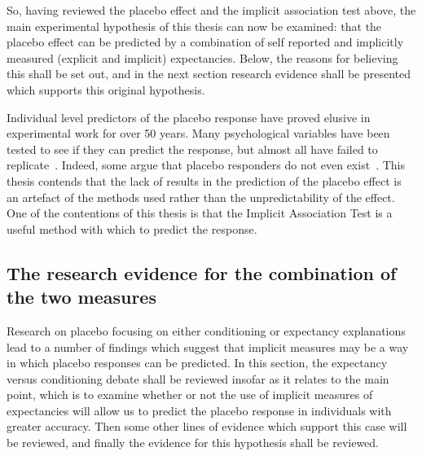 
So, having reviewed the placebo effect and the implicit association test above, the main experimental hypothesis of this thesis can now be examined: that the placebo effect can be predicted by a combination of self reported and implicitly measured (explicit and implicit) expectancies. Below, the reasons for believing this shall be set out, and in the next section  research evidence shall be presented which supports this original hypothesis. 

Individual level predictors of the placebo response have proved elusive in experimental work for over 50 years. Many psychological variables have been tested to see if they can predict the response, but almost all have failed to replicate~\cite{Shapiro1997}. Indeed, some argue that placebo responders do not even exist~\cite{Kaptchuk2008a}. This thesis contends that the lack of results in the prediction of the placebo effect is an artefact of the methods used rather than the unpredictability of the effect. One of the contentions of this thesis is that the Implicit Association Test is a useful method with which to predict the response. 


\subsection{The research evidence for the combination of the two measures}
\label{sec:rese-base-comb}

Research on placebo focusing on either conditioning or expectancy explanations lead to a number of findings which suggest that implicit measures may be a way in which placebo responses can be predicted. In this section, the expectancy versus conditioning debate shall be reviewed insofar as it relates to the main point, which is to examine whether or not the use of implicit measures of expectancies will allow us to predict the placebo response in individuals with greater accuracy. Then  some other lines of evidence which support this case will be reviewed, and finally the evidence for this hypothesis shall be reviewed. 

